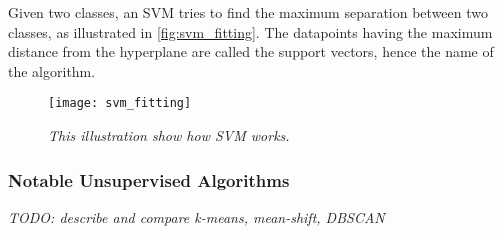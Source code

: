 \documentclass[lit_review.tex]{subfiles}
\begin{document}
Given two classes, an SVM tries to find the maximum separation between two classes, as illustrated in \autoref{fig:svm_fitting}. The datapoints having the maximum distance from the hyperplane are called the support vectors, hence the name of the algorithm.

\begin{figure}[h]
  \centering
  \texttt{[image: svm\_fitting]}
  \caption{\textit{This illustration show how SVM works.}}
  \label{fig:svm_fitting}
\end{figure}


\subsubsection{Notable Unsupervised Algorithms}
\textit{TODO: describe and compare k-means, mean-shift, DBSCAN}
\end{document}
